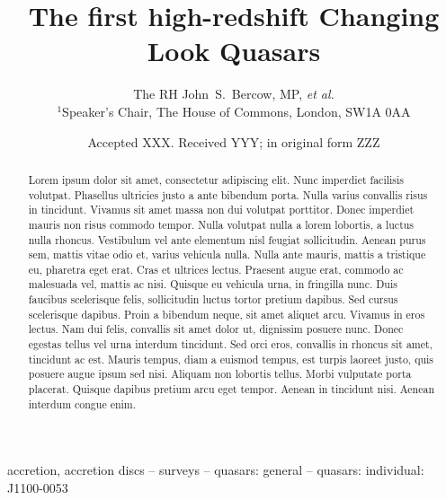 \documentclass[a4paper,fleqn,usenatbib]{mnras}
\title[High-redshift CLQs]{The first high-redshift Changing Look Quasars}
\author[Bercow]
{The RH John~S.~Bercow, MP, {\it et al.} 
\\
$^{1}$Speaker's Chair, The House of Commons, London, SW1A 0AA \\
}
\date{Accepted XXX. Received YYY; in original form ZZZ}
\begin{document}
\label{firstpage}
\pagerange{\pageref{firstpage}--\pageref{lastpage}}
\maketitle


\begin{abstract}
Lorem ipsum dolor sit amet, consectetur adipiscing elit. Nunc imperdiet facilisis volutpat. Phasellus ultricies justo a ante bibendum porta. Nulla varius convallis risus in tincidunt. Vivamus sit amet massa non dui volutpat porttitor. Donec imperdiet mauris non risus commodo tempor. Nulla volutpat nulla a lorem lobortis, a luctus nulla rhoncus. Vestibulum vel ante elementum nisl feugiat sollicitudin. Aenean purus sem, mattis vitae odio et, varius vehicula nulla.
Nulla ante mauris, mattis a tristique eu, pharetra eget erat. Cras et ultrices lectus. Praesent augue erat, commodo ac malesuada vel, mattis ac nisi. Quisque eu vehicula urna, in fringilla nunc. Duis faucibus scelerisque felis, sollicitudin luctus tortor pretium dapibus. Sed cursus scelerisque dapibus. Proin a bibendum neque, sit amet aliquet arcu. Vivamus in eros lectus. Nam dui felis, convallis sit amet dolor ut, dignissim posuere nunc. Donec egestas tellus vel urna interdum tincidunt. Sed orci eros, convallis in rhoncus sit amet, tincidunt ac est. Mauris tempus, diam a euismod tempus, est turpis laoreet justo, quis posuere augue ipsum sed nisi. Aliquam non lobortis tellus. Morbi vulputate porta placerat. Quisque dapibus pretium arcu eget tempor. Aenean in tincidunt nisi. Aenean interdum congue enim.
\end{abstract}

\begin{keywords}
accretion, accretion discs -- surveys -- quasars: general -- quasars: individual: J1100-0053 
\end{keywords}



\end{document}
